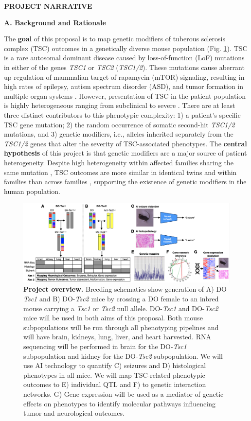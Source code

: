 \documentclass[
  12pt,
]{article}
\author{}
\date{\vspace{-2.5em}}
\begin{document}
\textbf{PROJECT NARRATIVE}

\textbf{A. Background and Rationale}

The \textbf{goal} of this proposal is to map genetic modifiers of
tuberous sclerosis complex (TSC) outcomes in a genetically diverse mouse
population (Fig. \ref{fig:overview}). TSC is a rare autosomal dominant
disease caused by loss-of-function (LoF) mutations in either of the
genes \textit{TSC1} or \textit{TSC2} (\textit{TSC1/2}). These mutations
cause aberrant up-regulation of mammalian target of rapamycin (mTOR)
signaling, resulting in high rates of epilepsy, autism spectrum disorder
(ASD), and tumor formation in multiple organ systems \cite{17005952}.
However, presentation of TSC in the patient population is highly
heterogeneous ranging from subclinical to severe
\cite{gomez_tuberous_1999, 8423606, 17005952, 8057044, 29687738, 28127866, 29926239}.
There are at least three distinct contributors to this phenotypic
complexity: 1) a patient's specific TSC gene mutation; 2) the random
occurrence of somatic second-hit \textit{TSC1/2} mutations, and 3)
genetic modifiers, i.e., alleles inherited separately from the
\textit{TSC1/2} genes that alter the severity of TSC-associated
phenotypes. The \textbf{central hypothesis} of this project is that
genetic modifiers are a major source of patient heterogeneity. Despite
high heterogeneity within affected families sharing the same mutation
\cite{29687738, 28127866, 29926239}, TSC outcomes are more similar in
identical twins and within families than across families
\cite{18174550}, supporting the existence of genetic modifiers in the
human population.

\begin{figure}[ht!]
\includegraphics[width=\textwidth]{Fig1.png} 
\caption{\textbf{Project overview.} Breeding schematics show generation of A) DO-\textit{Tsc1} and B) DO-\textit{Tsc2} mice by crossing a DO female to an inbred mouse carrying a \textit{Tsc1} or \textit{Tsc2} null allele. DO-\textit{Tsc1} and DO-\textit{Tsc2} mice will be used in both aims of this proposal. Both mouse subpopulations will be run through all phenotyping pipelines and will have brain, kidneys, lung, liver, and heart harvested. RNA sequencing will be performed in brain for the DO-\textit{Tsc1} subpopulation and kidney for the DO-\textit{Tsc2} subpopulation. We will use AI technology to quantify C) seizures and D) histological phenotypes in all mice. We will map TSC-related phenotypic outcomes to E) individual QTL and F) to genetic interaction networks. G) Gene expression will be used as a mediator of genetic effects on phenotypes to identify molecular pathways influencing tumor and neurological outcomes.
}
\label{fig:overview}
\end{figure}
\end{document}

